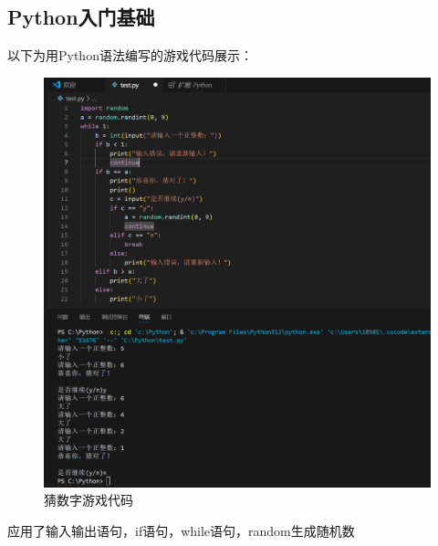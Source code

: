 \documentclass{ctexart}
\begin{document}
\subsection{Python入门基础}
以下为用Python语法编写的游戏代码展示：\\
\begin{figure}[H]
    \centering
    \includegraphics[width=12cm]{dc30954917dbdb9ff42e049b4c26fc44.png}
    \caption{猜数字游戏代码}
    \label{fig:11}
\end{figure}
应用了输入输出语句，if语句，while语句，random生成随机数
\end{document}
